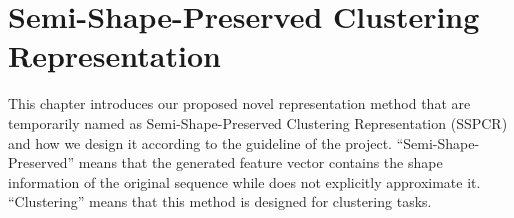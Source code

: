\chapter{Semi-Shape-Preserved Clustering Representation}
This chapter introduces our proposed novel representation method that are temporarily named as Semi-Shape-Preserved Clustering Representation (SSPCR) and how we design it according to the guideline of the project. ``Semi-Shape-Preserved'' means that the generated feature vector contains the shape information of the original sequence while does not explicitly approximate it. ``Clustering'' means that this method is designed for clustering tasks.